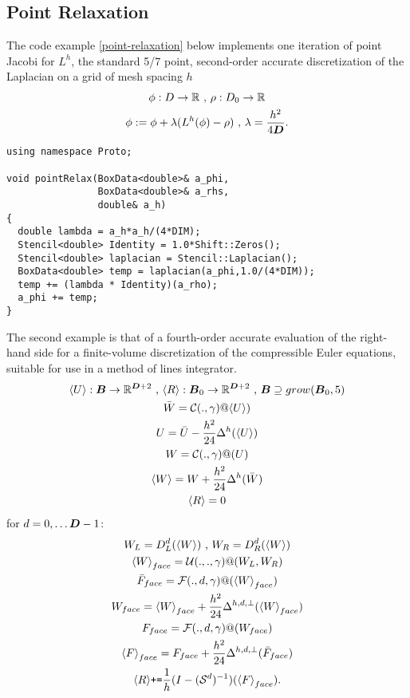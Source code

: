 \documentclass[12pt]{article}
\newcommand{\av}[1]{{\langle #1 \rangle}}
\begin{document}
\subsection{Point Relaxation}
The code example \ref{point-relaxation} below implements one iteration of point Jacobi for $L^h$, the standard 5/7 point, second-order accurate discretization of the Laplacian on a grid of mesh spacing $h$
\begin{gather*}
\phi:D \rightarrow \mathbb{R} \hbox{ , } \rho : D_0 \rightarrow \mathbb{R} \\
\phi := \phi + \lambda (L^h(\phi) - \rho) \hbox{ , } \lambda = \frac{h^2}{4 {\boldsymbol{D}}}.
\end{gather*}
\begin{lstlisting}[label=point-relaxation , caption=Point Jacobi Relaxation for Poisson]
using namespace Proto;

void pointRelax(BoxData<double>& a_phi,
                BoxData<double>& a_rhs,
                double& a_h)
{
  double lambda = a_h*a_h/(4*DIM);
  Stencil<double> Identity = 1.0*Shift::Zeros(); 
  Stencil<double> laplacian = Stencil::Laplacian();
  BoxData<double> temp = laplacian(a_phi,1.0/(4*DIM));
  temp += (lambda * Identity)(a_rho);
  a_phi += temp;
}
\end{lstlisting}
The second example is that of a fourth-order accurate evaluation of the right-hand side for a finite-volume discretization of the compressible Euler equations, suitable for use in a method of lines integrator.
\begin{gather*}
\av{U}: \boldsymbol{B} \rightarrow \mathbb{R}^{\DIM+2} \hbox{ , } \av{R} : \boldsymbol{B}_0 \rightarrow \mathbb{R}^{\DIM + 2} \hbox{ , } \boldsymbol{B} \supseteq grow(\boldsymbol{B}_0, 5) \\
\bar{W} = \mathcal{C}(.,\gamma)@\av{U}) \\
U = \bar{U} - \frac{h^2}{24} \Delta^h(\av{U})\\
W  = \mathcal{C}(.,\gamma)@(U) \\
\av{W} = W + \frac{h^2}{24} \Delta^h(\bar{W}) \\
\av{R} = 0
\end{gather*}
for $d = 0 , \dots {\boldsymbol{D}}-1$:
\begin{gather*}
W_L = D_L^d(\av{W}) \hbox{ , } W_R = D_R^d (\av{W}) \\
\av{W}_{face} = \mathcal{U}(.,.,\gamma)@(W_L,W_R) \\
\bar{F}_{face} = \mathcal{F}(.,d,\gamma)@(\av{W}_{face}) \\
W_{face} = \av{W}_{face} + \frac{h^2}{24} \Delta^{h,d,\perp}(\av{W}_{face}) \\
F_{face} = \mathcal{F}(.,d,\gamma)@({W}_{face}) \\
\av{F}_{face} = F_{face} + \frac{h^2}{24}\Delta^{h,d,\perp} (\bar{F}_{face}) \\
\av{R} \hbox{\tt +=}\frac{1}{h}(I - (\mathcal{S}^d)^{-1})(\av{F}_{face}).
\end{gather*}
\end{document}
